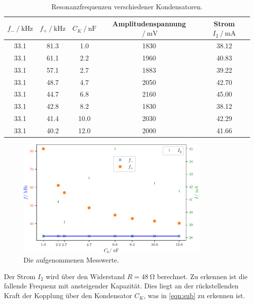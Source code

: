 \begin{table}
    \centering
    \caption{Resonanzfrequenzen verschiedener Kondensatoren.}
    \label{tab:resonanz}
    \begin{tabular}{c c c c c}
        \toprule
        $f_- \:/\: \si{\kilo\hertz}$ & $f_+ \:/\: \si{\kilo\hertz}$ & $C_K \:/\: \si{\nano\farad}$ & Amplitudenspannung $\:/\: \si{\milli\volt}$ & Strom $I_2 \:/\: \si{\milli\ampere}$ \\
        \midrule
        33.1 & 81.3 & 1.0  & 1830  &  38.12  \\
        33.1 & 61.1 & 2.2  & 1960  &  40.83  \\
        33.1 & 57.1 & 2.7  & 1883  &  39.22  \\
        33.1 & 48.7 & 4.7  & 2050  &  42.70  \\
        33.1 & 44.7 & 6.8  & 2160  &  45.00  \\
        33.1 & 42.8 & 8.2  & 1830  &  38.12  \\
        33.1 & 41.4 & 10.0 & 2030  &  42.29  \\
        33.1 & 40.2 & 12.0 & 2000  &  41.66  \\
        \bottomrule
    \end{tabular}
\end{table}

\begin{figure}
    \centering
    \includegraphics[width=0.85\textwidth]{plots/Messdaten.pdf}
    \caption{Die aufgenommenen Messwerte.}
    \label{fig:messwerte}
\end{figure}

Der Strom $I_2$ wird über den Widerstand $R = \SI{48}{\ohm}$ berechnet.
Zu erkennen ist die fallende Frequenz mit ansteigender Kapazität. Dies liegt an der rückstellenden Kraft der Kopplung über den Kondensator $C_K$, was in \eqref{eqn:sub} zu erkennen ist.

